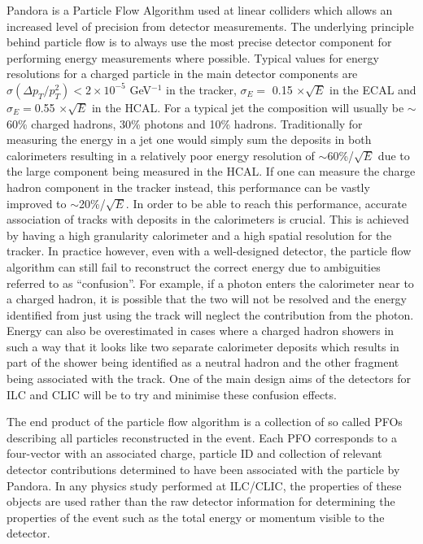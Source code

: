 Pandora\cite{Thomson200925} is a Particle Flow Algorithm used at linear colliders which allows an increased level of precision from detector measurements. The underlying principle behind particle flow is to always use the most precise detector component for performing energy measurements where possible. Typical values for energy resolutions for a charged particle in the main detector components are $\sigma(\Delta p_T/ p_{T}^2) < 2 \times 10^{-5}$ GeV$^{-1}$ in the tracker, $\sigma_E =$ 0.15 $\times \sqrt{E}$ in the \ac{ECAL} and $\sigma_E =$0.55 $\times \sqrt{E}$ in the \ac{HCAL}. For a typical jet the composition will usually be $\sim$60\% charged hadrons, 30\% photons and 10\% hadrons. Traditionally for measuring the energy in a jet one would simply sum the deposits in both calorimeters resulting in a relatively poor energy resolution of $\sim$60\%/$\sqrt{E}$ due to the large component being measured in the \ac{HCAL}. If one can measure the charge hadron component in the tracker instead, this performance can be vastly improved to $\sim$20\%/$\sqrt{E}$. In order to be able to reach this performance, accurate association of tracks with deposits in the calorimeters is crucial. This is achieved by having a high granularity calorimeter and a high spatial resolution for the tracker. In practice however, even with a well-designed detector, the particle flow algorithm can still fail to reconstruct the correct energy due to ambiguities referred to as ``confusion''. For example, if a photon enters the calorimeter near to a charged hadron, it is possible that the two will not be resolved and the energy identified from just using the track will neglect the contribution from the photon. Energy can also be overestimated in cases where a charged hadron showers in such a way that it looks like two separate calorimeter deposits which results in part of the shower being identified as a neutral hadron and the other fragment being associated with the track. One of the main design aims of the detectors for \ac{ILC} and \ac{CLIC} will be to try and minimise these confusion effects.

The end product of the particle flow algorithm is a collection of so called \ac{PFO}s describing all particles reconstructed in the event. Each \ac{PFO} corresponds to a four-vector with an associated charge, particle ID and collection of relevant detector contributions determined to have been associated with the particle by Pandora. In any physics study performed at \ac{ILC}/\ac{CLIC}, the properties of these objects are used rather than the raw detector information for determining the properties of the event such as the total energy or momentum visible to the detector.



